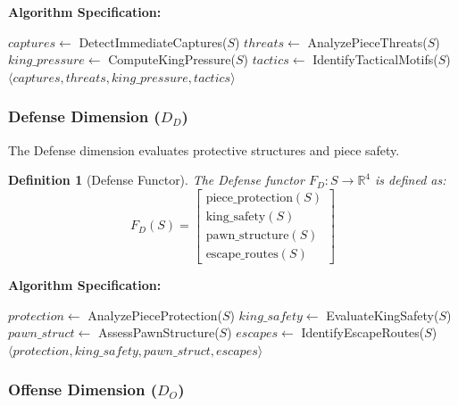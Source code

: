 \documentclass[12pt,a4paper]{article}
\newtheorem{definition}{Definition}
\begin{document}
\textbf{Algorithm Specification:}
\begin{algorithm}[H]
\caption{Attack Algorithm}
\begin{algorithmic}
    \State $captures \leftarrow$ DetectImmediateCaptures($S$)
    \State $threats \leftarrow$ AnalyzePieceThreats($S$)
    \State $king\_pressure \leftarrow$ ComputeKingPressure($S$)
    \State $tactics \leftarrow$ IdentifyTacticalMotifs($S$)
    \State \Return $\langle captures, threats, king\_pressure, tactics \rangle$
\EndFunction
\end{algorithmic}
\end{algorithm}



\subsubsection{Defense Dimension (\texorpdfstring{$D_D$}{DD})}

The Defense dimension evaluates protective structures and piece safety.

\begin{definition}[Defense Functor]
The Defense functor $F_D: S \rightarrow \mathbb{R}^4$ is defined as:
$$F_D(S) = \begin{bmatrix}
\text{piece\_protection}(S) \\
\text{king\_safety}(S) \\
\text{pawn\_structure}(S) \\
\text{escape\_routes}(S)
\end{bmatrix}$$
\end{definition}

\textbf{Algorithm Specification:}
\begin{algorithm}[H]
\caption{Defense Algorithm}
\begin{algorithmic}
    \State $protection \leftarrow$ AnalyzePieceProtection($S$)
    \State $king\_safety \leftarrow$ EvaluateKingSafety($S$)
    \State $pawn\_struct \leftarrow$ AssessPawnStructure($S$)
    \State $escapes \leftarrow$ IdentifyEscapeRoutes($S$)
    \State \Return $\langle protection, king\_safety, pawn\_struct, escapes \rangle$
\EndFunction
\end{algorithmic}
\end{algorithm}

\subsubsection{Offense Dimension (\texorpdfstring{$D_O$}{DO})}
\end{document}
